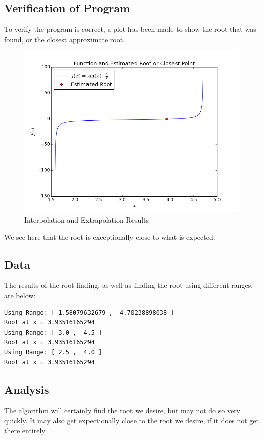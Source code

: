 \documentclass[10pt,letter]{article}
\begin{document}
\subsection{Verification of Program}

To verify the program is correct, a plot has been made to show the root that was found, or the closest approximate root.

\begin{figure}[h]
  \centering
    \includegraphics[width=.7\textwidth]{homework2_problem1_plot1}
  \caption{Interpolation and Extrapolation Results}
\end{figure}

We see here that the root is exceptionally close to what is expected.

\subsection{Data}

The results of the root finding, as well as finding the root using different ranges, are below:

\begin{verbatim}
Using Range: [ 1.58079632679 ,  4.70238898038 ]
Root at x = 3.93516165294
Using Range: [ 3.0 ,  4.5 ]
Root at x = 3.93516165294
Using Range: [ 2.5 ,  4.0 ]
Root at x = 3.93516165294
\end{verbatim}

\subsection{Analysis}

The algorithm will certainly find the root we desire, but may not do so very quickly. It may also get expectionally close to the root we desire, if it does not get there entirely.
\end{document}

